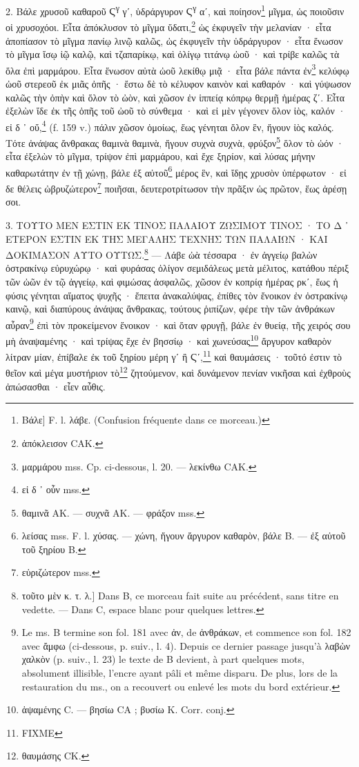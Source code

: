 \documentclass[a4paper, 11pt, oneside, polutonikogreek, french]{article}
\begin{document}
2. Βάλε χρυσοῦ καθαροῦ Ϛ\textsuperscript{γ} γʹ, ὑδράργυρον Ϛ\textsuperscript{γ} αʹ, καὶ ποίησον\footnote{Bάλε] F. l. λάβε. (Confusion fréquente dans ce morceau.)} μῖγμα, ὡς ποιοῦσιν οἱ χρυσοχόοι. Εἶτα ἀπόκλυσον τὸ μῖγμα ὕδατι,\footnote{ἀπόκλεισον CAK.} ὡς ἐκφυγεῖν τὴν μελανίαν · εἶτα ἀποπίασον τὸ μῖγμα πανίῳ λινῷ καλῶς, ὡς ἐκφυγεῖν τὴν ὑδράργυρον · εἶτα ἕνωσον τὸ μῖγμα ἴσῳ ἰῷ καλῷ, καὶ τζαπαρίκῳ, καὶ ὀλίγῳ τιτάνῳ ὠοῦ · καὶ τρίβε καλῶς τὰ ὅλα ἐπὶ μαρμάρου. Εἶτα ἕνωσον αὐτὰ ὠοῦ λεκίθῳ μιᾷ · εἶτα βάλε πάντα ἐν\footnote{μαρμάρου mss. Cp. ci-dessous, l. 20. --- λεκίνθω CAK.} κελύφῳ ὠοῦ στερεοῦ ἐκ μιᾶς ὀπῆς · ἔστω δὲ τὸ κέλυφον καινὸν καὶ καθαρόν · καὶ γύψωσον καλῶς τὴν ὀπὴν καὶ ὅλον τὸ ὠὸν, καὶ χῶσον ἐν ἱππείᾳ κόπρῳ θερμῇ ἡμέρας ζʹ. Εἶτα ἐξελὼν ἴδε ἐκ τῆς ὀπῆς τοῦ ὠοῦ τὸ σύνθεμα · καὶ εἰ μὲν γέγονεν ὅλον ἰὸς, καλόν · εἰ δ ᾽ οὔ,\footnote{εἰ δ ᾽ οὗν mss.} (f. 159 v.) πάλιν χῶσον ὁμοίως, ἕως γένηται ὅλον ἓν, ἤγουν ἰὸς καλός. Τότε ἀνάψας ἄνθρακας θαμινὰ θαμινὰ, ἤγουν συχνὰ συχνὰ, φρύξον\footnote{θαμινᾶ AK. --- συχνᾶ AK. --- φράξον mss.} ὅλον τὸ ὠόν · εἶτα ἐξελὼν τὸ μῖγμα, τρίψον ἐπὶ μαρμάρου, καὶ ἔχε ξηρίον, καὶ λύσας μήνην καθαρωτάτην ἐν τῇ χώνῃ, βάλε ἐξ αὐτοῦ\footnote{λείσας mss. F. l. χύσας. --- χώνη, ἤγουν ἄργυρον καθαρὸν, βάλε B. --- ἐξ αὐτοῦ τοῦ ξηρίου B.} μέρος ἓν, καὶ ἴδῃς χρυσὸν ὑπέρφωτον · εἰ δε θέλεις ὠβρυζώτερον\footnote{εὐριζώτερον mss.} ποιῆσαι, δευτεροτρίτωσον τὴν πρᾶξιν ὡς πρῶτον, ἕως ἀρέσῃ σοι.

3. ΤΟΥΤΟ ΜΕΝ ΕΣΤΙΝ ΕΚ ΤΙΝΟΣ ΠΑΛΑΙΟΥ ΖΩΣΙΜΟΥ ΤΙΝΟΣ · ΤΟ Δ ᾽ ΕΤΕΡΟΝ ΕΣΤΙΝ ΕΚ ΤΗΣ ΜΕΓΑΛΗΣ ΤΕΧΝΗΣ ΤΩΝ ΠΑΛΑΙΩΝ · ΚΑΙ ΔΟΚΙΜΑΣΟΝ ΑΥΤΟ ΟΥΤΩΣ.\footnote{τοῦτο μὲν κ. τ. λ.] Dans B, ce morceau fait suite au précédent, sans titre en vedette. --- Dans C, espace blanc pour quelques lettres.} --- Λάβε ὠὰ τέσσαρα · ἐν ἀγγείῳ βαλὼν ὀστρακίνῳ εὐρυχώρῳ · καὶ φυράσας ὀλίγον σεμιδάλεως μετὰ μέλιτος, κατάθου πέριξ τῶν ὠῶν ἐν τῷ ἀγγείῳ, καὶ φιμώσας ἀσφαλῶς, χῶσον ἐν κοπρίᾳ ἡμέρας ρκʹ, ἕως ἡ φύσις γένηται αἵματος ψυχῆς · ἔπειτα ἀνακαλύψας, ἐπίθες τὸν ἔνοικον ἐν ὀστρακίνῳ καινῷ, καὶ διαπύρους ἀνάψας ἄνθρακας, τούτους ῥιπίζων, φέρε τὴν τῶν ἀνθράκων αὖραν\footnote{Le ms. B termine son fol. 181 avec ἀν, de ἀνθράκων, et commence son fol. 182 avec ἄμφω (ci-dessous, p. suiv., l. 4). Depuis ce dernier passage jusqu'à λαβὼν χαλκὸν (p. suiv., l. 23) le texte de B devient, à part quelques mots, absolument illisible, l'encre ayant pâli et même disparu. De plus, lors de la restauration du ms., on a recouvert ou enlevé les mots du bord extérieur.} ἐπὶ τὸν προκείμενον ἔνοικον · καὶ ὅταν φρυγῇ, βάλε ἐν θυείᾳ, τῆς χειρός σου μὴ ἀναψαμένης · καὶ τρίψας ἔχε ἐν βησσίῳ · καὶ χωνεύσας\footnote{ἁψαμένης C. --- βησίω CA ; βυσίω K. Corr. conj.} ἄργυρον καθαρὸν λίτραν μίαν, ἐπίβαλε ἐκ τοῦ ξηρίου μέρη γʹ ἢ Ϛʹ,\footnote{FIXME} καὶ θαυμάσεις · τοῦτό ἐστιν τὸ θεῖον καὶ μέγα μυστήριον τὸ\footnote{θαυμάσης CK.} ζητούμενον, καὶ δυνάμενον πενίαν νικῆσαι καὶ ἐχθροὺς ἀπώσασθαι · εἶεν αὖθις.
\end{document}
